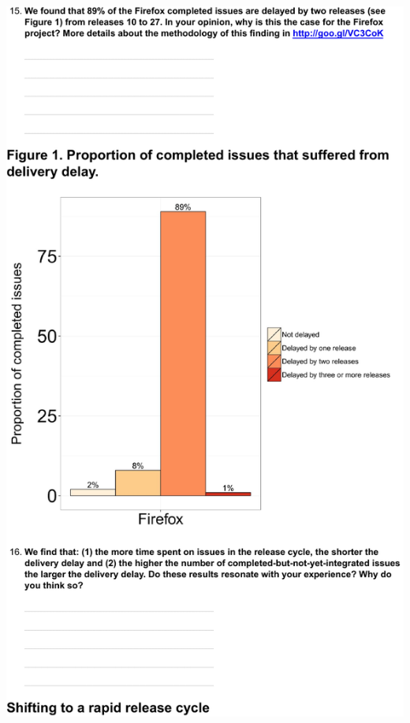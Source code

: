 \documentclass[
	12pt,				%
	openright,			%
	oneside,			%
	a4paper,			%
	french,				%
	spanish,			%
	brazil,				%
	english
	]{abntex2}
\newcounter{pt}
\newcounter{th}
\begin{document}
\begin{apendicesenv}
\includegraphics[width=.8\textwidth,keepaspectratio]{chapters/chapter5/appendix/Firefox5.pdf}


\end{apendicesenv}
\end{document}
